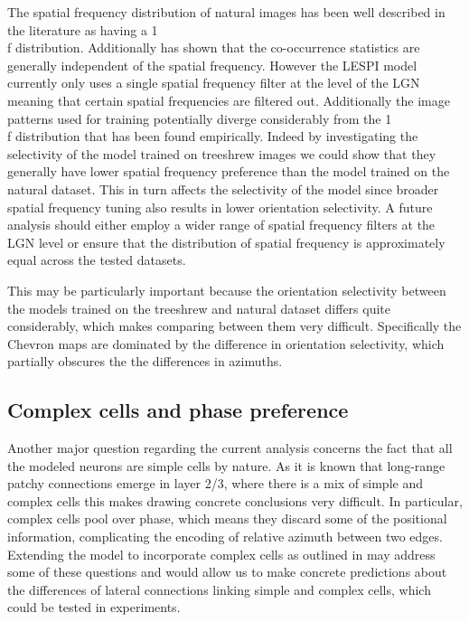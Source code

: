 The spatial frequency distribution of natural images has been well
described in the literature as having a 1\\f
distribution. Additionally \cite{Perrinet2015} has shown that the
co-occurrence statistics are generally independent of the spatial
frequency. However the LESPI model currently only uses a single
spatial frequency filter at the level of the LGN meaning that certain
spatial frequencies are filtered out. Additionally the image patterns
used for training potentially diverge considerably from the 1\\f
distribution that has been found empirically. Indeed by investigating
the selectivity of the model trained on treeshrew images we could show
that they generally have lower spatial frequency preference than the
model trained on the natural dataset. This in turn affects the
selectivity of the model since broader spatial frequency tuning also
results in lower orientation selectivity. A future analysis should
either employ a wider range of spatial frequency filters at the LGN
level or ensure that the distribution of spatial frequency is
approximately equal across the tested datasets.

This may be particularly important because the orientation selectivity
between the models trained on the treeshrew and natural dataset
differs quite considerably, which makes comparing between them very
difficult. Specifically the Chevron maps are dominated by the
difference in orientation selectivity, which partially obscures the
the differences in azimuths.

\subsection{Complex cells and phase preference}

Another major question regarding the current analysis concerns the
fact that all the modeled neurons are simple cells by nature. As it is
known that long-range patchy connections emerge in layer 2/3, where
there is a mix of simple and complex cells this makes drawing concrete
conclusions very difficult. In particular, complex cells pool over
phase, which means they discard some of the positional information,
complicating the encoding of relative azimuth between two
edges. Extending the model to incorporate complex cells as outlined in
\cite{Antolik2010} may address some of these questions and would allow
us to make concrete predictions about the differences of lateral
connections linking simple and complex cells, which could be tested in
experiments.

